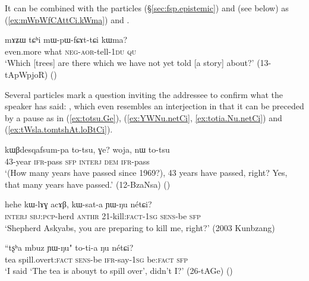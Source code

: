 It can be combined with the particles   (§\ref{sec:fsp.epistemic})  and  (see below) as  (\ref{ex:mWpWfCAttCi.kWma}) and .

\begin{exe}
\ex \label{ex:mWpWfCAttCi.kWma}
\gll  mɤʑɯ tɕʰi mɯ-pɯ-fɕɤt-tɕi kɯma? \\
 even.more what \textsc{neg}-\textsc{aor}-tell-\textsc{1du} \textsc{qu} \\
 \glt `Which [trees] are there which we have not yet told [a story] about?' (13-tApWpjoR) 	()
\end{exe} 

Several particles mark a question inviting the addressee to confirm what the speaker has said: , which even resembles an interjection in that it can be preceded by a pause as in (\ref{ex:totsu.Ge}),  (\ref{ex:YWNu.netCi}, \ref{ex:totia.Nu.netCi}) and  (\ref{ex:tWsla.tomtshAt.loBtCi}).

\begin{exe}
\ex \label{ex:totsu.Ge}
\gll kɯβdesqafsum-pa to-tsu, ɣe? woja, nɯ to-tsu \\
 43-year \textsc{ifr}-pass \textsc{sfp} \textsc{interj} \textsc{dem} \textsc{ifr}-pass \\
\glt `(How many years have passed since 1969?), 43 years have passed, right? Yes, that many years have passed.' (12-BzaNsa) 	()
\end{exe}

\begin{exe}
\ex \label{ex:YWNu.netCi}
\gll hehe kɯ-lɤɣ acɤβ, kɯ-sat-a ɲɯ-ŋu nétɕi? \\
\textsc{interj} \textsc{sbj}:\textsc{pcp}-herd  \textsc{anthr} 2\fl{}1-kill:\textsc{fact}-\textsc{1sg} \textsc{sens}-be \textsc{sfp} \\
\glt `Shepherd Askyabs, you are preparing to kill me, right?' (2003 Kunbzang)
\end{exe}

\begin{exe}
\ex \label{ex:totia.Nu.netCi}
\gll  ``tʂʰa mbuz ɲɯ-ŋu" to-ti-a ŋu nétɕi? \\
tea spill.overt:\textsc{fact} \textsc{sens}-be \textsc{ifr}-say-\textsc{1sg} be:\textsc{fact} \textsc{sfp} \\
\glt `I said `The tea is abouyt to spill over', didn't I?' (26-tAGe) 	()
 \end{exe}
 
